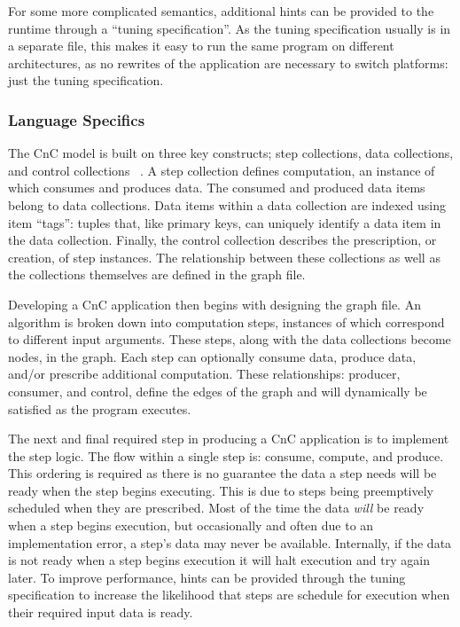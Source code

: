 For some more complicated semantics, additional hints can be provided
to the runtime through a ``tuning specification''. As the tuning
specification usually is in a separate file, this makes it easy to run
the same program on different architectures, as no rewrites of the
application are necessary to switch platforms: just the tuning
specification.

\subsubsection{Language Specifics}
The CnC model is built on three key constructs; step collections, data
collections, and control collections ~\cite{budimlicconcurrent}. A
step collection defines computation, an instance of which consumes and
produces data. The consumed and produced data items belong to data
collections. Data items within a data collection are indexed using
item ``tags'': tuples that, like primary keys, can uniquely identify a
data item in the data collection. Finally, the control collection
describes the prescription, or creation, of step instances. The
relationship between these collections as well as the collections
themselves are defined in the graph file.

Developing a CnC application then begins with designing the graph
file. An algorithm is broken down into computation steps, instances of
which correspond to different input arguments. These steps, along with
the data collections become nodes, in the graph. Each step can
optionally consume data, produce data, and/or prescribe additional
computation. These relationships: producer, consumer, and control,
define the edges of the graph and will dynamically be satisfied as the
program executes.

The next and final required step in producing a CnC application is to
implement the step logic. The flow within a single step is: consume,
compute, and produce. This ordering is required as there is no
guarantee the data a step needs will be ready when the step begins
executing. This is due to steps being preemptively scheduled when they
are prescribed. Most of the time the data \emph{will} be ready when a
step begins execution, but occasionally and often due to an
implementation error, a step’s data may never be available.
Internally, if the data is not ready when a step begins execution
it will halt execution and try again later. To improve performance,
hints can be provided through the tuning specification to increase the
likelihood that steps are schedule for execution when their required
input data is ready.

